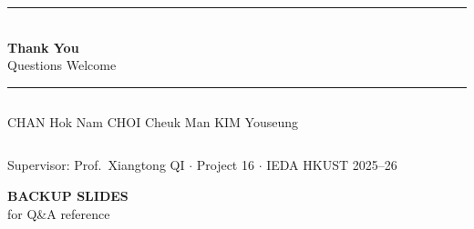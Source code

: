 \documentclass[aspectratio=169,14pt]{beamer}
\begin{document}
\begin{frame}
\begin{center}
  \vspace{1cm}
  {\color{hkustblue}\rule{\linewidth}{2pt}}\\[0.8cm]
  {\Huge\bfseries\color{hkustblue} Thank You}\\[0.6cm]
  {\Large Questions Welcome}\\[0.8cm]
  {\color{hkustblue}\rule{\linewidth}{2pt}}

  \vspace{0.8cm}
  \begin{columns}
    \centering
    {\small CHAN Hok Nam}
    \centering
    {\small CHOI Cheuk Man}
    \centering
    {\small KIM Youseung}
  \end{columns}

  \vspace{0.4cm}
  {\footnotesize Supervisor: Prof.\ Xiangtong QI $\cdot$ Project 16 $\cdot$ IEDA HKUST 2025--26}
\end{center}
\end{frame}


\begin{frame}[plain]
\begin{center}
  \vspace{1.5cm}
  {\Large\bfseries\color{gray} BACKUP SLIDES}\\[0.2cm]
  {\small for Q\&A reference}
\end{center}
\end{frame}
\end{document}
